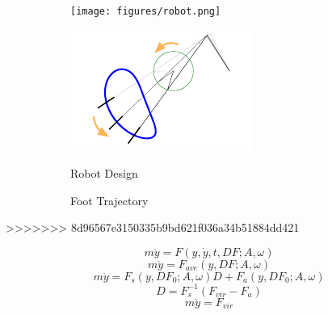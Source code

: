 \documentclass[letterpaper,twocolumn]{article}
\begin{document}
\begin{figure}[tb]
	\centering
	\begin{subfigure}[c]{0.24\textwidth}
		\centering
		\texttt{[image: figures/robot.png]}
	\end{subfigure}
	\begin{subfigure}[c]{0.24\textwidth}
		\centering
		\includegraphics[width = \textwidth]{figures/traj.pdf}
	\end{subfigure}

	\begin{subfigure}[c]{0.24\textwidth}
		\caption{Robot Design}
		\label{fig:robot}
	\end{subfigure}
	\begin{subfigure}[c]{0.24\textwidth}
		\caption{Foot Trajectory}
		\label{fig:traj}
	\end{subfigure}
	\caption{}
\end{figure}
>>>>>>> 8d96567e3150335b9bd621f036a34b51884dd421


\begin{equation}
	m \ddot{y} =  F(y,\dot{y},t,DF;A,\omega)
	\label{eq:force}
\end{equation}
\begin{equation}
	m \ddot{y} = F_{ave}(y,DF;A,\omega)
	\label{eq:force_ave}
\end{equation}
\begin{equation}
	m \ddot{y} = F_{s}(y,DF_0;A,\omega)D+F_{a}(y,DF_0;A,\omega)
	\label{eq:force_linear}
\end{equation}
\begin{equation}	
	D = F_{s}^{-1}(F_{vir}-F_{a})
	\label{eq:control}
\end{equation}
\begin{equation}	
	m\ddot{y} = F_{vir}
	\label{eq:virtual_model}
\end{equation}
\end{document}
